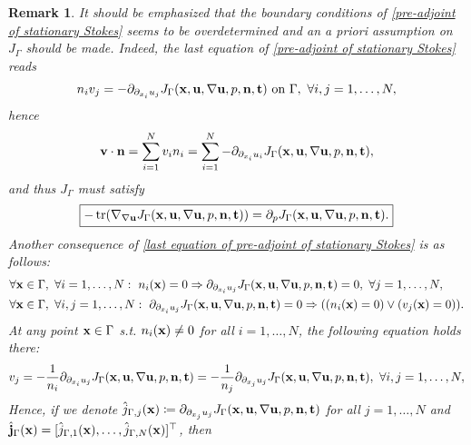 \documentclass[oneside]{book}
\numberwithin{equation}{section}
\newtheorem{remark}{Remark}[section]
\begin{document}
\begin{itemize}
    \begin{remark}
        It should be emphasized that the boundary conditions of \eqref{pre-adjoint of stationary Stokes} seems to be overdetermined and an a priori assumption on $J_\Gamma$ should be made. Indeed, the last equation of \eqref{pre-adjoint of stationary Stokes} reads
        \begin{align}
            \label{last equation of pre-adjoint of stationary Stokes}
            n_iv_j = -\partial_{\partial_{x_i}u_j}J_\Gamma({\bf x},{\bf u},\nabla{\bf u},p,{\bf n},{\bf t}) \mbox{ on } \Gamma,\ \forall i,j = 1,\ldots,N,
        \end{align}
        hence
        \begin{align*}
            {\bf v}\cdot{\bf n} = \sum_{i=1}^N v_in_i = \sum_{i=1}^N -\partial_{\partial_{x_i}u_i}J_\Gamma({\bf x},{\bf u},\nabla{\bf u},p,{\bf n},{\bf t}),
        \end{align*}
        and thus $J_\Gamma$ must satisfy
        \begin{align*}
            \boxed{-\operatorname{tr}(\nabla_{\nabla{\bf u}}J_\Gamma({\bf x},{\bf u},\nabla{\bf u},p,{\bf n},{\bf t})) = \partial_pJ_\Gamma({\bf x},{\bf u},\nabla{\bf u},p,{\bf n},{\bf t}).}
        \end{align*}
        Another consequence of \eqref{last equation of pre-adjoint of stationary Stokes} is as follows:
        \begin{align*}
            &\forall{\bf x}\in\Gamma,\ \forall i = 1,\ldots,N:\ n_i({\bf x}) = 0\Rightarrow\partial_{\partial_{x_i}u_j}J_\Gamma({\bf x},{\bf u},\nabla{\bf u},p,{\bf n},{\bf t}) = 0,\ \forall j = 1,\ldots,N,\\
            &\forall{\bf x}\in\Gamma,\ \forall i,j = 1,\ldots,N:\ \partial_{\partial_{x_i}u_j}J_\Gamma({\bf x},{\bf u},\nabla{\bf u},p,{\bf n},{\bf t}) = 0\Rightarrow((n_i({\bf x}) = 0)\vee(v_j({\bf x}) = 0)).
        \end{align*}
        At any point ${\bf x}\in\Gamma$ s.t. $n_i({\bf x})\ne 0$ for all $i = 1,\ldots,N$, the following equation holds there:
        \begin{align*}
            v_j = -\frac{1}{n_i}\partial_{\partial_{x_i}u_j}J_\Gamma({\bf x},{\bf u},\nabla{\bf u},p,{\bf n},{\bf t}) = -\frac{1}{n_j}\partial_{\partial_{x_j}u_j}J_\Gamma({\bf x},{\bf u},\nabla{\bf u},p,{\bf n},{\bf t}),\ \forall i,j = 1,\ldots,N,
        \end{align*}
        Hence, if we denote $\hat{j}_{\Gamma,j}({\bf x})\coloneqq\partial_{\partial_{x_j}u_j}J_\Gamma({\bf x},{\bf u},\nabla{\bf u},p,{\bf n},{\bf t})$ for all $j = 1,\ldots,N$ and $\hat{\bf j}_\Gamma({\bf x}) = [\hat{j}_{\Gamma,1}({\bf x}),\ldots,\hat{j}_{\Gamma,N}({\bf x})]^\top$, then

\end{remark}
\end{itemize}
\end{document}
